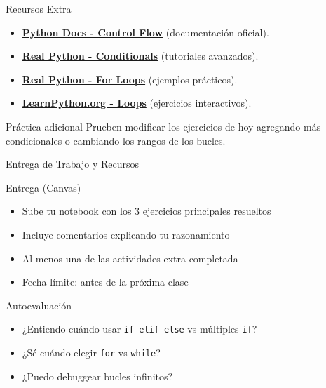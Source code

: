 \documentclass[10pt]{beamer}
\begin{document}
\begin{frame}{Recursos Extra}
  \begin{itemize}
    \item \href{https://docs.python.org/3/tutorial/controlflow.html}{\textbf{Python Docs - Control Flow}} (documentación oficial).
    \item \href{https://realpython.com/python-conditional-statements/}{\textbf{Real Python - Conditionals}} (tutoriales avanzados).
    \item \href{https://realpython.com/python-for-loop/}{\textbf{Real Python - For Loops}} (ejemplos prácticos).
    \item \href{https://www.learnpython.org/en/Loops}{\textbf{LearnPython.org - Loops}} (ejercicios interactivos).
  \end{itemize}
  
  \begin{block}{Práctica adicional}
    Prueben modificar los ejercicios de hoy agregando más condicionales o cambiando los rangos de los bucles.
  \end{block}
\end{frame}

\begin{frame}{Entrega de Trabajo y Recursos}
  \begin{block}{Entrega (Canvas)}
    \begin{itemize}
      \item Sube tu notebook con los 3 ejercicios principales resueltos
      \item Incluye comentarios explicando tu razonamiento
      \item Al menos una de las actividades extra completada
      \item Fecha límite: antes de la próxima clase
    \end{itemize}
  \end{block}
  
  \begin{block}{Autoevaluación}
    \begin{itemize}
      \item ¿Entiendo cuándo usar \texttt{if-elif-else} vs múltiples \texttt{if}?
      \item ¿Sé cuándo elegir \texttt{for} vs \texttt{while}?
      \item ¿Puedo debuggear bucles infinitos?
    \end{itemize}
  \end{block}
\end{frame}
\end{document}
